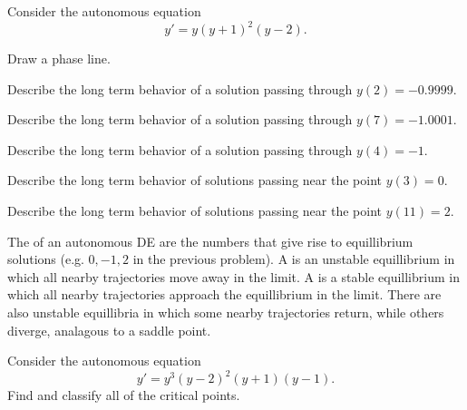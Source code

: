 \begin{applicationActivities}
\begin{activity}{15}
Consider the autonomous equation \[y'=y(y+1)^2(y-2).\]

\begin{subactivity}
Draw a phase line.
\end{subactivity}
\begin{subactivity}
Describe the long term behavior of a solution passing through \(y(2)=-0.9999\).
\end{subactivity}
\begin{subactivity}
Describe the long term behavior of a solution passing through \(y(7)=-1.0001\).
\end{subactivity}
\begin{subactivity}
Describe the long term behavior of a solution passing through \(y(4)=-1\).
\end{subactivity}
\begin{subactivity}
Describe the long term behavior of solutions passing near the point \(y(3)=0\).
\end{subactivity}
\begin{subactivity}
Describe the long term behavior of solutions passing near the point \(y(11)=2\).
\end{subactivity}
\end{activity}

\begin{definition}
The  of an autonomous DE are the numbers that give rise to equillibrium solutions (e.g. \(0,-1,2\) in the previous problem).
\vfill
A  is an unstable equillibrium in which all nearby trajectories move away in the limit.
\vfill
A  is a stable equillibrium in which all nearby trajectories approach the equillibrium in the limit.
\vfill
There are also unstable equillibria in which some nearby trajectories return, while others diverge, analagous to a saddle point.
\end{definition}

\begin{activity}{10}
Consider the autonomous equation \[y'=y^3(y-2)^2(y+1)(y-1).\]
\vfill
Find and classify all of the critical points.
\end{activity}


\end{applicationActivities}

